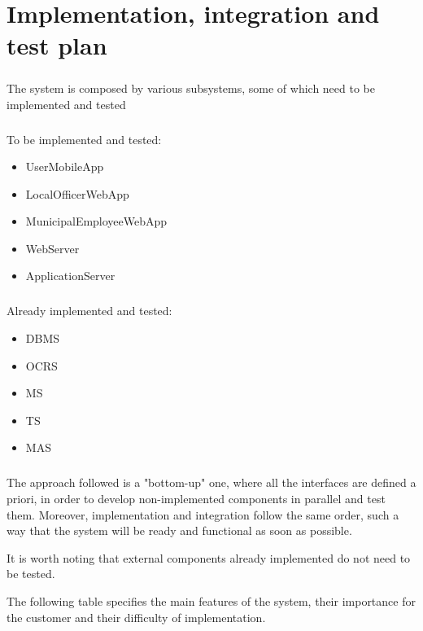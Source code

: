 	\chapter{Implementation, integration and test plan}
		\paragraph{}
			The system is composed by various subsystems, some of which need to be implemented and tested
		\paragraph{}
			To be implemented and tested:
			\begin{itemize}
				\item UserMobileApp
				\item LocalOfficerWebApp
				\item MunicipalEmployeeWebApp
				\item WebServer
				\item ApplicationServer
			\end{itemize}
		\paragraph{}
			Already implemented and tested:
				\begin{itemize}
					\item DBMS
					\item OCRS
					\item MS
					\item TS
					\item MAS
				\end{itemize}
		\paragraph{}
			The approach followed is a "bottom-up" one, where all the interfaces are defined a priori, in order to develop non-implemented components in parallel and test them. Moreover, implementation and integration follow the same order, such a way that the system will be ready and functional as soon as possible. 
			
			It is worth noting that external components already implemented do not need to be tested. 
			
			The following table specifies the main features of the system, their importance for the customer and their  difficulty of implementation.
			
